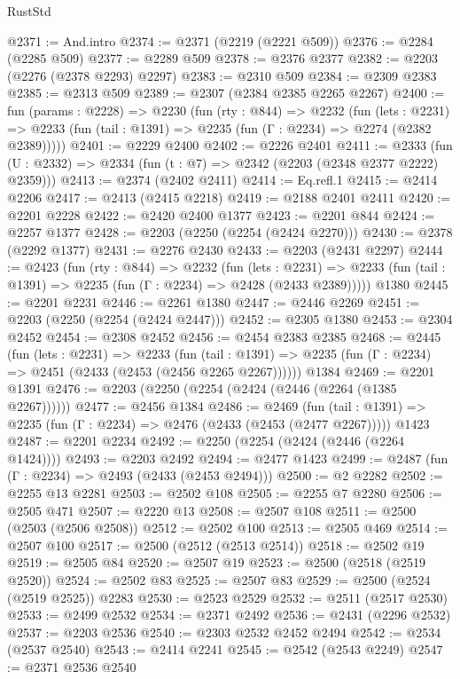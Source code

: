 \begin{lexlean}{RustStd}
\begin{coremodule}
@2371 := And.intro
@2374 := @2371 (@2219 (@2221 @509))
@2376 := @2284 (@2285 @509)
@2377 := @2289 @509
@2378 := @2376 @2377
@2382 := @2203 (@2276 (@2378 @2293) @2297)
@2383 := @2310 @509
@2384 := @2309 @2383
@2385 := @2313 @509
@2389 := @2307 (@2384 @2385 @2265 @2267)
@2400 := fun (params : @2228) =>
  @2230
    (fun (rty : @844) =>
    @2232
      (fun (lets : @2231) =>
      @2233 (fun (tail : @1391) => @2235 (fun (Γ : @2234) => @2274 (@2382 @2389)))))
@2401 := @2229 @2400
@2402 := @2226 @2401
@2411 := @2333 (fun (U : @2332) => @2334 (fun (t : @7) => @2342 (@2203 (@2348 @2377 @2222) @2359)))
@2413 := @2374 (@2402 @2411)
@2414 := Eq.refl.{1}
@2415 := @2414 @2206
@2417 := @2413 (@2415 @2218)
@2419 := @2188 @2401 @2411
@2420 := @2201 @2228
@2422 := @2420 @2400 @1377
@2423 := @2201 @844
@2424 := @2257 @1377
@2428 := @2203 (@2250 (@2254 (@2424 @2270)))
@2430 := @2378 (@2292 @1377)
@2431 := @2276 @2430
@2433 := @2203 (@2431 @2297)
@2444 := @2423
    (fun (rty : @844) =>
    @2232
      (fun (lets : @2231) =>
      @2233 (fun (tail : @1391) => @2235 (fun (Γ : @2234) => @2428 (@2433 @2389)))))
    @1380
@2445 := @2201 @2231
@2446 := @2261 @1380
@2447 := @2446 @2269
@2451 := @2203 (@2250 (@2254 (@2424 @2447)))
@2452 := @2305 @1380
@2453 := @2304 @2452
@2454 := @2308 @2452
@2456 := @2454 @2383 @2385
@2468 := @2445
    (fun (lets : @2231) =>
    @2233
      (fun (tail : @1391) => @2235 (fun (Γ : @2234) => @2451 (@2433 (@2453 (@2456 @2265 @2267))))))
    @1384
@2469 := @2201 @1391
@2476 := @2203 (@2250 (@2254 (@2424 (@2446 (@2264 (@1385 @2267))))))
@2477 := @2456 @1384
@2486 := @2469
    (fun (tail : @1391) => @2235 (fun (Γ : @2234) => @2476 (@2433 (@2453 (@2477 @2267)))))
    @1423
@2487 := @2201 @2234
@2492 := @2250 (@2254 (@2424 (@2446 (@2264 @1424))))
@2493 := @2203 @2492
@2494 := @2477 @1423
@2499 := @2487 (fun (Γ : @2234) => @2493 (@2433 (@2453 @2494)))
@2500 := @2 @2282
@2502 := @2255 @13 @2281
@2503 := @2502 @108
@2505 := @2255 @7 @2280
@2506 := @2505 @471
@2507 := @2220 @13
@2508 := @2507 @108
@2511 := @2500 (@2503 (@2506 @2508))
@2512 := @2502 @100
@2513 := @2505 @469
@2514 := @2507 @100
@2517 := @2500 (@2512 (@2513 @2514))
@2518 := @2502 @19
@2519 := @2505 @84
@2520 := @2507 @19
@2523 := @2500 (@2518 (@2519 @2520))
@2524 := @2502 @83
@2525 := @2507 @83
@2529 := @2500 (@2524 (@2519 @2525)) @2283
@2530 := @2523 @2529
@2532 := @2511 (@2517 @2530)
@2533 := @2499 @2532
@2534 := @2371 @2492
@2536 := @2431 (@2296 @2532)
@2537 := @2203 @2536
@2540 := @2303 @2532 @2452 @2494
@2542 := @2534 (@2537 @2540)
@2543 := @2414 @2241
@2545 := @2542 (@2543 @2249)
@2547 := @2371 @2536 @2540

\end{coremodule}
\end{lexlean}
